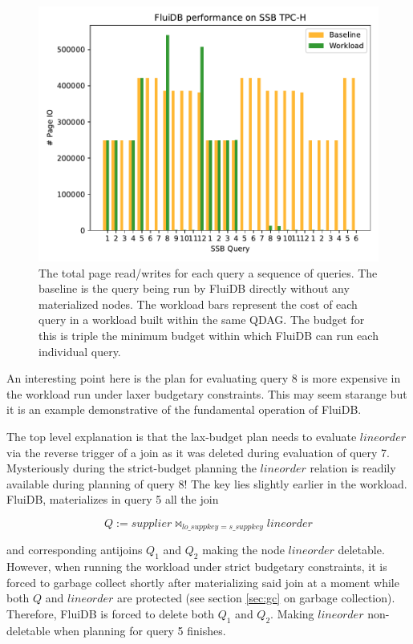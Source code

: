 \begin{figure}[p]
\centering
\includegraphics[width=.9\linewidth]{./plans/io_perf_60000.pdf}

\caption{\label{fig:large_budget_plot}
  The total page read/writes for each query a sequence of queries. The
  baseline is the query being run by FluiDB directly without any
  materialized nodes. The workload bars represent the cost of each
  query in a workload built within the same QDAG. The budget for this
  is triple the minimum budget within which FluiDB can run each
  individual query.}
\end{figure}

An interesting point here is the plan for evaluating query 8 is more
expensive in the workload run under laxer budgetary constraints. This
may seem starange but it is an example demonstrative of the
fundamental operation of FluiDB.

The top level explanation is that the lax-budget plan needs to
evaluate \(\mathit{lineorder}\) via the reverse trigger of a join as
it was deleted during evaluation of query 7. Mysteriously during the
strict-budget planning the \(\mathit{lineorder}\) relation is readily
available during planning of query 8! The key lies slightly earlier in
the workload. FluiDB, materializes in query 5 all the join

\[
Q := \mathit{supplier} \Join_{\mathit{lo\_suppkey} = \mathit{s\_suppkey}} \mathit{lineorder}
\]

and corresponding antijoins \(Q_1\) and \(Q_2\) making the node
\(\mathit{lineorder}\) deletable. However, when running the workload
under strict budgetary constraints, it is forced to garbage collect
shortly after materializing said join at a moment while both \(Q\) and
\(\mathit{lineorder}\) are protected (see section \ref{sec:gc} on
garbage collection). Therefore, FluiDB is forced to delete both
\(Q_1\) and \(Q_2\). Making \(\mathit{lineorder}\) non-deletable
when planning for query 5 finishes.


